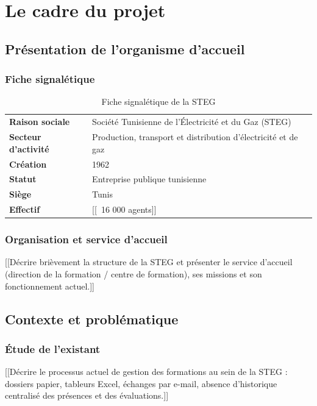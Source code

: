 \documentclass[12pt,a4paper]{report}
\begin{document}
\chapter{Le cadre du projet}
\setcounter{page}{1}

\section{Présentation de l'organisme d'accueil}
\subsection{Fiche signalétique}
\begin{table}[H]
\centering
\begin{tabular}{p{4.5cm} p{8.5cm}}
\toprule
\textbf{Raison sociale} & Société Tunisienne de l'Électricité et du Gaz (STEG) \\
\textbf{Secteur d'activité} & Production, transport et distribution d'électricité et de gaz \\
\textbf{Création} & 1962 \\
\textbf{Statut} & Entreprise publique tunisienne \\
\textbf{Siège} & Tunis \\
\textbf{Effectif} & [[~16 000 agents]] \\
\bottomrule
\end{tabular}
\caption{Fiche signalétique de la STEG}
\end{table}

\subsection{Organisation et service d'accueil}
[[Décrire brièvement la structure de la STEG et présenter le service d'accueil
(direction de la formation / centre de formation), ses missions et son
fonctionnement actuel.]]

\section{Contexte et problématique}
\subsection{Étude de l'existant}
[[Décrire le processus actuel de gestion des formations au sein de la STEG :
dossiers papier, tableurs Excel, échanges par e-mail, absence d'historique
centralisé des présences et des évaluations.]]
\end{document}
